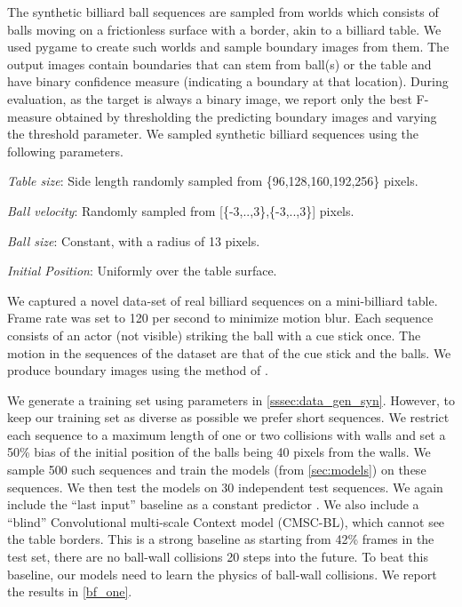 The synthetic billiard ball sequences are sampled from worlds which consists of balls moving on a frictionless surface with a border, akin to a billiard table. We used pygame to create such worlds and sample boundary images from them. The output images contain  boundaries that can stem from ball(s) or the table and have binary confidence measure (indicating a boundary at that location). During evaluation, as the target is always a binary image, we report only the best F-measure obtained by thresholding the predicting boundary images and varying the threshold parameter. 
\label{sssec:data_gen_syn}
We sampled synthetic billiard sequences using the following parameters.
\begin{enumerate*}
    \item {\it Table size}: Side length randomly sampled from \{96,128,160,192,256\} pixels.
    \item {\it Ball velocity}: Randomly sampled from [\{-3,..,3\},\{-3,..,3\}] pixels.
    \item {\it Ball size}: Constant, with a radius of 13 pixels.
    \item {\it Initial Position}: Uniformly over the table surface.
\end{enumerate*}

We captured a novel data-set of real billiard sequences on a mini-billiard table. Frame rate was set to 120 per second to minimize motion blur. Each sequence consists of an actor (not visible) striking the ball with a cue stick once. The motion in the sequences of the dataset are that of the cue stick and the balls. We produce boundary images using the method of \cite{Man+16a}.

We generate a training set using parameters in \autoref{sssec:data_gen_syn}. However, to keep our training set as diverse as possible we prefer short sequences. We restrict each sequence to a maximum length of one or two collisions with walls and set a 50\% bias of the initial position of the balls being 40 pixels from the walls. We sample 500 such sequences and train the models (from \autoref{sec:models}) on these sequences. We then test the models on 30 independent test sequences. We again include the ``last input'' baseline as a constant predictor . We also include a ``blind'' Convolutional multi-scale Context model (CMSC-BL), which cannot see the table borders. This is a strong baseline as starting from 42\% frames in the test set, there are no ball-wall collisions 20 steps into the future. To beat this baseline, our models need to learn the physics of ball-wall collisions.  We report the results in \autoref{bf_one}.

